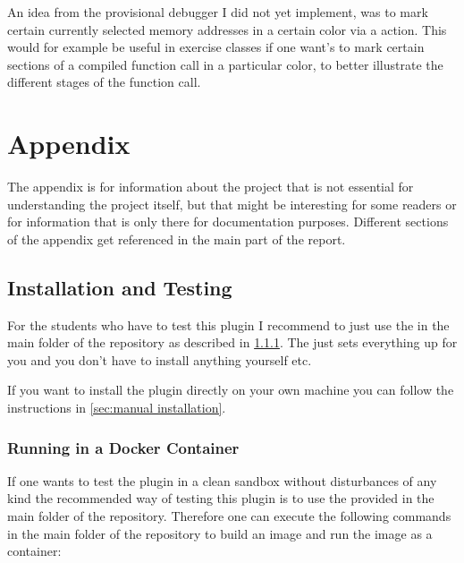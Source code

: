 \documentclass{report}
\begin{document}
An idea from the provisional debugger I did not yet implement, was to mark certain currently selected memory addresses in a certain color via a  action. This would for example be useful in exercise classes if one want's to mark certain sections of a compiled function call in a particular color, to better illustrate the different stages of the function call.

\clearpage
\chapter{Appendix}

The appendix is for information about the project that is not essential for understanding the project itself, but that might be interesting for some readers or for information that is only there for documentation purposes. Different sections of the appendix get referenced in the main part of the report.%

\section{Installation and Testing}
\label{sec:installation and testing}

For the students who have to test this plugin I recommend to just use the  in the main folder of the repository as described in \ref{sec:running in a docker image}. The  just sets everything up for you and you don't have to install anything yourself etc.

If you want to install the plugin directly on your own machine you can follow the instructions in \ref{sec:manual installation}.

\subsection{Running in a Docker Container}
\label{sec:running in a docker image}

If one wants to test the plugin in a clean sandbox without disturbances of any kind the recommended way of testing this plugin is to use the provided  in the main folder of the repository. Therefore one can execute the following commands in the main folder of the repository to build an \alert{image} and run the image as a \alert{container}:
\end{document}
